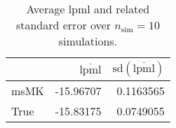 \begin{table}[H]

\caption{Average lpml and related standard error over $n_{\text{sim}} = 10$ simulations.}
\centering
\begin{tabular}[t]{lrr}
\toprule
  & $\overbar{\text{lpml}}$ & $\text{sd}(\overbar{\text{lpml}})$\\
\midrule
msMK & -15.96707 & 0.1163565\\
True & -15.83175 & 0.0749055\\
\bottomrule
\end{tabular}
\end{table}